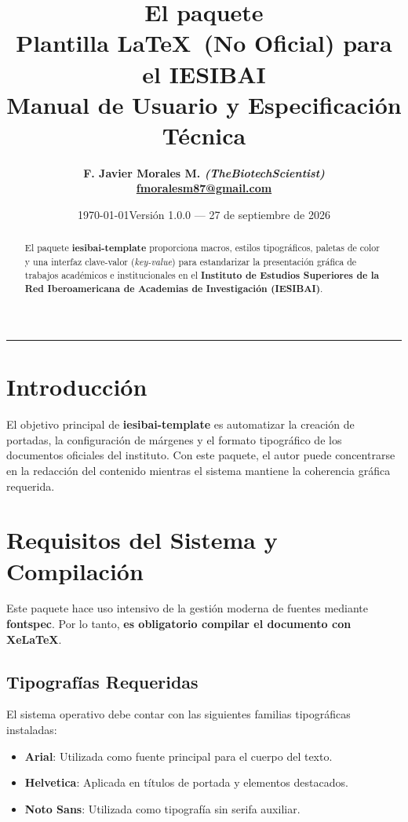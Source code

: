 \documentclass[11pt,a4paper]{article}
\title{%
    \Huge \textbf{\color{iesblueprimary}El paquete \pkg{iesibai-template}}\\[0.3em]
    \large Plantilla \LaTeX \ (No Oficial) para el \textbf{IESIBAI}\\[0.2em]
    \small Manual de Usuario y Especificación Técnica
}
\author{\textbf{F. Javier Morales M. \textit{(TheBiotechScientist)}}\\[10pt] {\bfseries \ttfamily \href{mailto:fmoralesm87@gmail.com}{fmoralesm87@gmail.com}}}
\date{\today}
\date{Versión 1.0.0 --- 27 de septiembre de 2026}
\newcommand{\pkg}[1]{\textbf{#1}}
\begin{document}
\maketitle

\begin{abstract}
El paquete \pkg{iesibai-template} proporciona macros, estilos tipográficos, paletas de color y una interfaz clave-valor (\emph{key-value}) para estandarizar la presentación gráfica de trabajos académicos e institucionales en el \textbf{Instituto de Estudios Superiores de la Red Iberoamericana de Academias de Investigación (IESIBAI)}.
\end{abstract}

\tableofcontents
\vspace{0.8cm}
\hrule
\vspace{0.8cm}

\section{Introducción}
El objetivo principal de \pkg{iesibai-template} es automatizar la creación de portadas, la configuración de márgenes y el formato tipográfico de los documentos oficiales del instituto. Con este paquete, el autor puede concentrarse en la redacción del contenido mientras el sistema mantiene la coherencia gráfica requerida.

\section{Requisitos del Sistema y Compilación}
Este paquete hace uso intensivo de la gestión moderna de fuentes mediante \pkg{fontspec}. Por lo tanto, \textbf{es obligatorio compilar el documento con XeLaTeX}.

\subsection{Tipografías Requeridas}
El sistema operativo debe contar con las siguientes familias tipográficas instaladas:
\begin{itemize}
    \item \textbf{Arial}: Utilizada como fuente principal para el cuerpo del texto.
    \item \textbf{Helvetica}: Aplicada en títulos de portada y elementos destacados.
    \item \textbf{Noto Sans}: Utilizada como tipografía sin serifa auxiliar.
\end{itemize}
\end{document}
